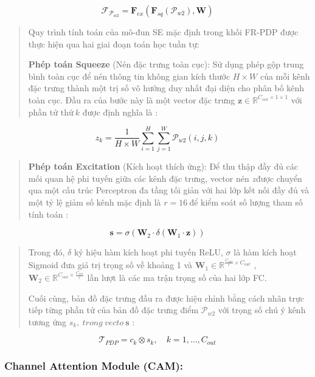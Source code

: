 \documentclass[
]{article}
\begin{document}
\[\mathcal{F}_{\mathcal{P}_{w2}} = \mathbf{F}_{ex}\left( \mathbf{F}_{sq}\left( \mathcal{P}_{w2} \right),\mathbf{W} \right)\]

\begin{quote}
Quy trình tính toán của mô-đun SE mặc định trong khối FR-PDP được thực
hiện qua hai giai đoạn toán học tuần tự:

\textbf{Phép toán Squeeze} (Nén đặc trưng toàn cục): Sử dụng phép gộp
trung bình toàn cục để nén thông tin không gian kích thước
\(H \times W\) của mỗi kênh đặc trưng thành một trị số vô hướng duy nhất
đại diện cho phân bố kênh toàn cục. Đầu ra của bước này là một vector
đặc trưng \(\mathbf{z} \in \mathbb{R}^{C_{out} \times 1 \times 1}\) với
phần tử thứ\(\ k\) được định nghĩa là :
\end{quote}

\[z_{k} = \frac{1}{H \times W}\sum_{i = 1}^{H}{\sum_{j = 1}^{W}\mathcal{P}_{w2}}(i,j,k)\]

\begin{quote}
\textbf{Phép toán Excitation} (Kích hoạt thích ứng): Để thu thập đầy đủ
các mối quan hệ phi tuyến giữa các kênh đặc trưng, vector nén \(z\)được
chuyển qua một cấu trúc Perceptron đa tầng tối giản với hai lớp kết nối
đầy đủ và một tỷ lệ giảm số kênh mặc định là \(r = 16\ \)để kiểm soát số
lượng tham số tính toán :
\end{quote}

\[\mathbf{s} = \sigma\left( \mathbf{W}_{2} \cdot \delta\left( \mathbf{W}_{1} \cdot \mathbf{z} \right) \right)\]

\begin{quote}
Trong đó, \(\delta\) ký hiệu hàm kích hoạt phi tuyến ReLU, \(\sigma\) là
hàm kích hoạt Sigmoid đưa giá trị trọng số về khoảng 1 và
\(\mathbf{W}_{1} \in \mathbb{R}^{\frac{C_{out}}{r} \times C_{out}}\) ,
\(\mathbf{W}_{2} \in \mathbb{R}^{C_{out} \times \frac{C_{out}}{r}}\) lần
lượt là các ma trận trọng số của hai lớp FC.

Cuối cùng, bản đồ đặc trưng đầu ra được hiệu chỉnh bằng cách nhân trực
tiếp từng phần tử của bản đồ đặc trưng điểm \(\mathcal{P}_{w2}\) với
trọng số chú ý kênh tương ứng \(s_{k},\ trong\ vecto\ \mathbf{s}\) :
\end{quote}

\[\mathcal{T}_{PDP} = c_{k} \otimes s_{k},\quad k = 1,\ldots,C_{out}\]

\hypertarget{channel-attention-module-cam}{%
\subsubsection{Channel Attention Module
(CAM):}\label{channel-attention-module-cam}}
\end{document}
